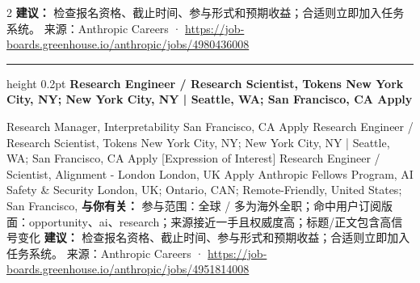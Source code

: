 \documentclass[10.5pt]{ctexart}
\begin{document}
\begin{multicols}{2}
\textbf{建议：} 检查报名资格、截止时间、参与形式和预期收益；合适则立即加入任务系统。
{\footnotesize\color{ormuted} 来源：Anthropic Careers · \url{https://job-boards.greenhouse.io/anthropic/jobs/4980436008}}
\vspace{2mm}
\hrule height 0.2pt
\vspace{2mm}
{\large\bfseries Research Engineer / Research Scientist, Tokens New York City, NY; New York City, NY | Seattle, WA; San Francisco, CA Apply}\par
[Expression of Interest] Research Manager, Interpretability San Francisco, CA Apply Research Engineer / Research Scientist, Tokens New York City, NY; New York City, NY | Seattle, WA; San Francisco, CA Apply [Expression of Interest] Research Engineer / Scientist, Alignment - London London, UK Apply Anthropic Fellows Program, AI Safety \& Security London, UK; Ontario, CAN; Remote-Friendly, United States; San Francisco, 
\textbf{与你有关：} 参与范围：全球 / 多为海外全职；命中用户订阅版面：opportunity、ai、research；来源接近一手且权威度高；标题/正文包含高信号变化
\textbf{建议：} 检查报名资格、截止时间、参与形式和预期收益；合适则立即加入任务系统。
{\footnotesize\color{ormuted} 来源：Anthropic Careers · \url{https://job-boards.greenhouse.io/anthropic/jobs/4951814008}}
\end{multicols}
\end{document}
